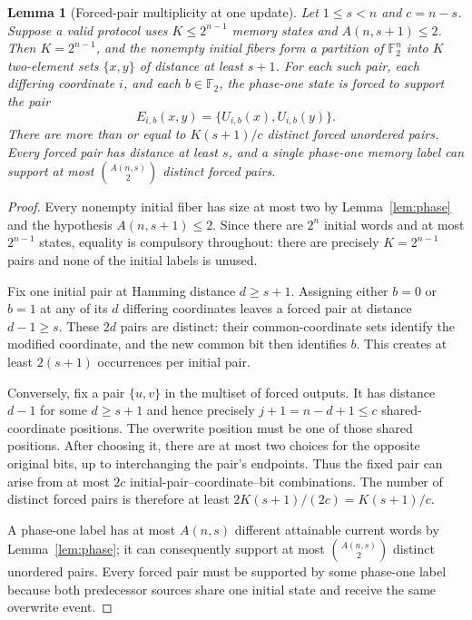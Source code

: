 \documentclass[11pt,a4paper]{article}
\newtheorem{lemma}[theorem]{Lemma}
\newcommand{\F}{\mathbb F_2}
\begin{document}
\begin{lemma}[Forced-pair multiplicity at one update]\label{lem:forced}
Let $1\le s<n$ and $c=n-s$. Suppose a valid protocol uses $K\le2^{n-1}$ memory states and $A(n,s+1)\le2$. Then $K=2^{n-1}$, and the nonempty initial fibers form a partition of $\F^n$ into $K$ two-element sets $\{x,y\}$ of distance at least $s+1$. For each such pair, each differing coordinate $i$, and each $b\in\F$, the phase-one state is forced to support the pair
\[
 E_{i,b}(x,y)=\{U_{i,b}(x),U_{i,b}(y)\}.
\]
There are more than or equal to $K(s+1)/c$ distinct forced unordered pairs. Every forced pair has distance at least $s$, and a single phase-one memory label can support at most $\binom{A(n,s)}2$ distinct forced pairs.
\end{lemma}
\begin{proof}
Every nonempty initial fiber has size at most two by Lemma~\ref{lem:phase} and the hypothesis $A(n,s+1)\le2$. Since there are $2^n$ initial words and at most $2^{n-1}$ states, equality is compulsory throughout: there are precisely $K=2^{n-1}$ pairs and none of the initial labels is unused.

Fix one initial pair at Hamming distance $d\ge s+1$. Assigning either $b=0$ or $b=1$ at any of its $d$ differing coordinates leaves a forced pair at distance $d-1\ge s$. These $2d$ pairs are distinct: their common-coordinate sets identify the modified coordinate, and the new common bit then identifies $b$. This creates at least $2(s+1)$ occurrences per initial pair.

Conversely, fix a pair $\{u,v\}$ in the multiset of forced outputs. It has distance $d-1$ for some $d\ge s+1$ and hence precisely $j+1=n-d+1\le c$ shared-coordinate positions. The overwrite position must be one of those shared positions. After choosing it, there are at most two choices for the opposite original bits, up to interchanging the pair's endpoints. Thus the fixed pair can arise from at most $2c$ initial-pair--coordinate--bit combinations. The number of distinct forced pairs is therefore at least $2K(s+1)/(2c)=K(s+1)/c$.

A phase-one label has at most $A(n,s)$ different attainable current words by Lemma~\ref{lem:phase}; it can consequently support at most $\binom{A(n,s)}2$ distinct unordered pairs. Every forced pair must be supported by some phase-one label because both predecessor sources share one initial state and receive the same overwrite event.
\end{proof}
\end{document}
